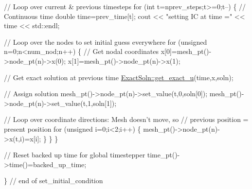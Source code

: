 \begin{DoxyCodeInclude}
 \textcolor{comment}{// Loop over current & previous timesteps}
 \textcolor{keywordflow}{for} (\textcolor{keywordtype}{int} t=nprev\_steps;t>=0;t--)
  \{
   \textcolor{comment}{// Continuous time}
   \textcolor{keywordtype}{double} time=prev\_time[t];
   cout << \textcolor{stringliteral}{"setting IC at time ="} << time << std::endl;
   
   \textcolor{comment}{// Loop over the nodes to set initial guess everywhere}
   \textcolor{keywordflow}{for} (\textcolor{keywordtype}{unsigned} n=0;n<num\_nod;n++)
    \{
     \textcolor{comment}{// Get nodal coordinates}
     x[0]=mesh\_pt()->node\_pt(n)->x(0);
     x[1]=mesh\_pt()->node\_pt(n)->x(1);

     \textcolor{comment}{// Get exact solution at previous time}
     \hyperlink{namespaceExactSoln_a2598550281dd62f4160edb3d0b2e5432}{ExactSoln::get\_exact\_u}(time,x,soln);
     
     \textcolor{comment}{// Assign solution}
     mesh\_pt()->node\_pt(n)->set\_value(t,0,soln[0]);
     mesh\_pt()->node\_pt(n)->set\_value(t,1,soln[1]);
     
     \textcolor{comment}{// Loop over coordinate directions: Mesh doesn't move, so }
     \textcolor{comment}{// previous position = present position}
     \textcolor{keywordflow}{for} (\textcolor{keywordtype}{unsigned} i=0;i<2;i++)
      \{
       mesh\_pt()->node\_pt(n)->x(t,i)=x[i];
      \}
    \} 
  \}

 \textcolor{comment}{// Reset backed up time for global timestepper}
 time\_pt()->time()=backed\_up\_time;

\} \textcolor{comment}{// end of set\_initial\_condition}

\end{DoxyCodeInclude}




 

